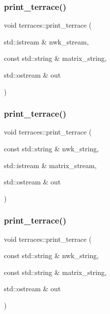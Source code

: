 \subsubsection{\texorpdfstring{print\+\_\+terrace()}{print\_terrace()}\hspace{0.1cm}{\footnotesize\ttfamily [2/4]}}
{\footnotesize\ttfamily void terraces\+::print\+\_\+terrace (\begin{DoxyParamCaption}\item[{std\+::istream \&}]{nwk\+\_\+stream,  }\item[{const std\+::string \&}]{matrix\+\_\+string,  }\item[{std\+::ostream \&}]{out }\end{DoxyParamCaption})}

\mbox{\label{namespaceterraces_a6b70762dab550c4b63c1fb12a976c79b}} 
\subsubsection{\texorpdfstring{print\+\_\+terrace()}{print\_terrace()}\hspace{0.1cm}{\footnotesize\ttfamily [3/4]}}
{\footnotesize\ttfamily void terraces\+::print\+\_\+terrace (\begin{DoxyParamCaption}\item[{const std\+::string \&}]{nwk\+\_\+string,  }\item[{std\+::istream \&}]{matrix\+\_\+stream,  }\item[{std\+::ostream \&}]{out }\end{DoxyParamCaption})}

\mbox{\label{namespaceterraces_abc9fdae9cfcc6334ed6e3a965e0dbd41}} 
\subsubsection{\texorpdfstring{print\+\_\+terrace()}{print\_terrace()}\hspace{0.1cm}{\footnotesize\ttfamily [4/4]}}
{\footnotesize\ttfamily void terraces\+::print\+\_\+terrace (\begin{DoxyParamCaption}\item[{const std\+::string \&}]{nwk\+\_\+string,  }\item[{const std\+::string \&}]{matrix\+\_\+string,  }\item[{std\+::ostream \&}]{out }\end{DoxyParamCaption})}

